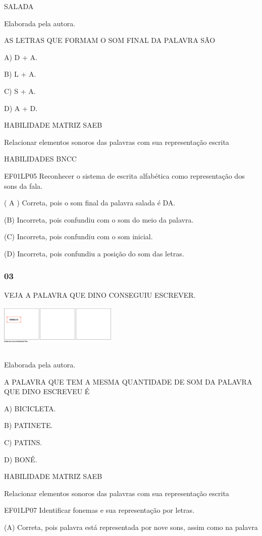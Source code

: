 SALADA

Elaborada pela autora.

AS LETRAS QUE FORMAM O SOM FINAL DA PALAVRA SÃO

A) D + A.

B) L + A.

C) S + A.

D) A + D.

HABILIDADE MATRIZ SAEB

Relacionar elementos sonoros das palavras com sua representação escrita

HABILIDADES BNCC

EF01LP05 Reconhecer o sistema de escrita alfabética como representação
dos sons da fala.

( A ) Correta, pois o som final da palavra salada é DA.

(B) Incorreta, pois confundiu com o som do meio da palavra.

(C) Incorreta, pois confundiu com o som inicial.

(D) Incorreta, pois confundiu a posição do som das
letras.\protect\hypertarget{_heading=h.ebpkik53igmj}{}{}

\subsubsection{03}\label{section-75}

VEJA A PALAVRA QUE DINO CONSEGUIU
ESCREVER.\includegraphics[width=2.21250in,height=1.04375in]{media/image243.png}

Elaborada pela autora.

A PALAVRA QUE TEM A MESMA QUANTIDADE DE SOM DA PALAVRA QUE DINO ESCREVEU
É

A) BICICLETA.

B) PATINETE.

C) PATINS.

D) BONÉ.

HABILIDADE MATRIZ SAEB

Relacionar elementos sonoros das palavras com sua representação escrita

EF01LP07 Identificar fonemas e sua representação por letras.

(A) Correta, pois palavra está representada por nove sons, assim como na
palavra

